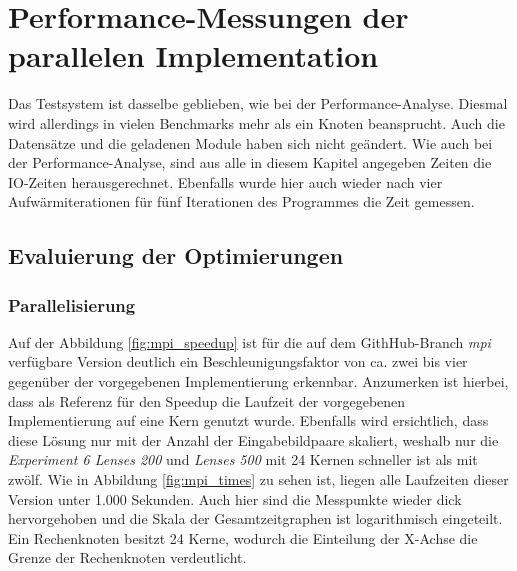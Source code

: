 \chapter{Performance-Messungen der parallelen Implementation}

Das Testsystem ist dasselbe geblieben, wie bei der Performance-Analyse. Diesmal wird allerdings in vielen Benchmarks mehr als ein Knoten beansprucht. Auch die Datensätze und die geladenen Module haben sich nicht geändert. Wie auch bei der Performance-Analyse, sind aus alle in diesem Kapitel angegeben Zeiten die \gls{IO}-Zeiten herausgerechnet. Ebenfalls wurde hier auch wieder nach vier Aufwärmiterationen für fünf Iterationen des Programmes die Zeit gemessen. 

\section{Evaluierung der Optimierungen}

\subsection{Parallelisierung}

Auf der Abbildung \ref{fig:mpi_speedup} ist für die auf dem GithHub-Branch \textit{mpi} verfügbare Version \cite{CBS18} deutlich ein Beschleunigungsfaktor von ca. zwei bis vier gegenüber der vorgegebenen Implementierung erkennbar. Anzumerken ist hierbei, dass als Referenz für den Speedup die Laufzeit der vorgegebenen Implementierung auf eine Kern genutzt wurde. Ebenfalls wird ersichtlich, dass diese Lösung nur mit der Anzahl der Eingabebildpaare skaliert, weshalb nur die \textit{Experiment 6 Lenses 200} und \textit{Lenses 500} mit 24 Kernen schneller ist als mit zwölf. Wie in Abbildung \ref{fig:mpi_times} zu sehen ist, liegen alle Laufzeiten dieser Version unter 1.000 Sekunden. Auch hier sind die Messpunkte wieder dick hervorgehoben und die Skala der Gesamtzeitgraphen ist logarithmisch eingeteilt. Ein Rechenknoten besitzt 24 Kerne, wodurch die Einteilung der X-Achse die Grenze der Rechenknoten verdeutlicht. 

